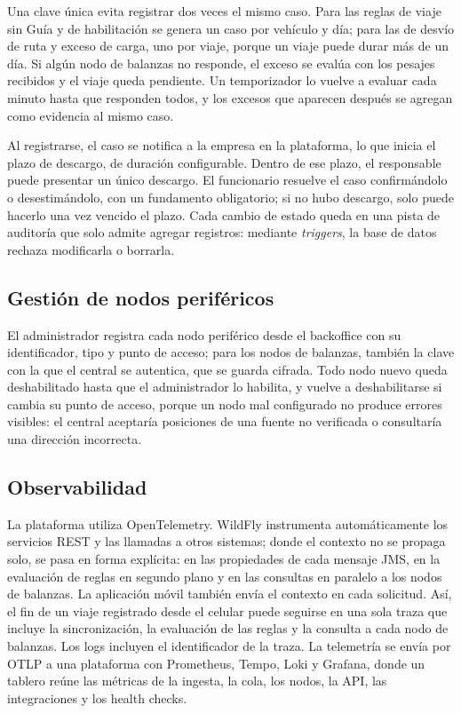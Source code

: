 Una clave única evita registrar dos veces el mismo caso. Para las reglas de viaje sin Guía y de habilitación se genera un caso por vehículo y día; para las de desvío de ruta y exceso de carga, uno por viaje, porque un viaje puede durar más de un día. Si algún nodo de balanzas no responde, el exceso se evalúa con los pesajes recibidos y el viaje queda pendiente. Un temporizador lo vuelve a evaluar cada minuto hasta que responden todos, y los excesos que aparecen después se agregan como evidencia al mismo caso.

Al registrarse, el caso se notifica a la empresa en la plataforma, lo que inicia el plazo de descargo, de duración configurable. Dentro de ese plazo, el responsable puede presentar un único descargo. El funcionario resuelve el caso confirmándolo o desestimándolo, con un fundamento obligatorio; si no hubo descargo, solo puede hacerlo una vez vencido el plazo. Cada cambio de estado queda en una pista de auditoría que solo admite agregar registros: mediante \textit{triggers}, la base de datos rechaza modificarla o borrarla.

\subsection{Gestión de nodos periféricos}
El administrador registra cada nodo periférico desde el backoffice con su identificador, tipo y punto de acceso; para los nodos de balanzas, también la clave con la que el central se autentica, que se guarda cifrada. Todo nodo nuevo queda deshabilitado hasta que el administrador lo habilita, y vuelve a deshabilitarse si cambia su punto de acceso, porque un nodo mal configurado no produce errores visibles: el central aceptaría posiciones de una fuente no verificada o consultaría una dirección incorrecta.

\subsection{Observabilidad}
La plataforma utiliza OpenTelemetry. WildFly instrumenta automáticamente los servicios REST y las llamadas a otros sistemas; donde el contexto no se propaga solo, se pasa en forma explícita: en las propiedades de cada mensaje JMS, en la evaluación de reglas en segundo plano y en las consultas en paralelo a los nodos de balanzas. La aplicación móvil también envía el contexto en cada solicitud. Así, el fin de un viaje registrado desde el celular puede seguirse en una sola traza que incluye la sincronización, la evaluación de las reglas y la consulta a cada nodo de balanzas. Los logs incluyen el identificador de la traza. La telemetría se envía por OTLP a una plataforma con Prometheus, Tempo, Loki y Grafana, donde un tablero reúne las métricas de la ingesta, la cola, los nodos, la API, las integraciones y los health checks.
